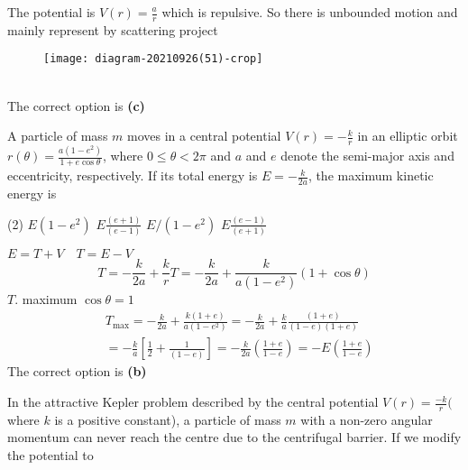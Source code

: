 \begin{enumerate}
\begin{tasks}
\end{tasks}
\begin{answer}
\begin{minipage}{0.5\textwidth}
	 The potential is $V(r)=\frac{a}{r}$ which is repulsive. So there is unbounded motion and mainly represent by scattering project
\end{minipage}
\begin{minipage}{0.5\textwidth}
\begin{figure}[H]
	\centering
	\texttt{[image: diagram-20210926(51)-crop]}
\end{figure}
\end{minipage}\\
The correct option is \textbf{(c)}
\end{answer}
\begin{minipage}{\textwidth}
	\item A particle of mass $m$ moves in a central potential $V(r)=-\frac{k}{r}$ in an elliptic orbit $r(\theta)=\frac{a\left(1-e^{2}\right)}{1+e \cos \theta}$, where $0 \leq \theta<2 \pi$ and $a$ and $e$ denote the semi-major axis and eccentricity, respectively. If its total energy is $E=-\frac{k}{2 a}$, the maximum kinetic energy is
\end{minipage}
\begin{tasks}(2)
	\task[\textbf{A.}] $E\left(1-e^{2}\right)$
	\task[\textbf{B.}]$E \frac{(e+1)}{(e-1)}$
	\task[\textbf{C.}]$E /\left(1-e^{2}\right)$
	\task[\textbf{D.}]$E \frac{(e-1)}{(e+1)}$
\end{tasks}
\begin{answer}
 $E=T+V \quad T=E-V$
$$
T=-\frac{k}{2 a}+\frac{k}{r} T=-\frac{k}{2 a}+\frac{k}{a\left(1-e^{2}\right)}(1+\cos \theta)
$$
$T$. maximum $\cos \theta=1$
$$
\begin{aligned}
&T_{\max }=-\frac{k}{2 a}+\frac{k(1+e)}{a\left(1-e^{2}\right)}=-\frac{k}{2 a}+\frac{k}{a} \frac{(1+e)}{(1-e)(1+e)} \\
&=-\frac{k}{a}\left[\frac{1}{2}+\frac{1}{(1-e)}\right]=-\frac{k}{2 a}\left(\frac{1+e}{1-e}\right)=-E\left(\frac{1+e}{1-e}\right)
\end{aligned}
$$
The correct option is \textbf{(b)}	
\end{answer}
\begin{minipage}{\textwidth}
	\item In the attractive Kepler problem described by the central potential $V(r)=\frac{-k}{r}($ where $k$ is a positive constant), a particle of mass $m$ with a non-zero angular momentum can never reach the centre due to the centrifugal barrier. If we modify the potential to

\end{minipage}
\end{enumerate}
